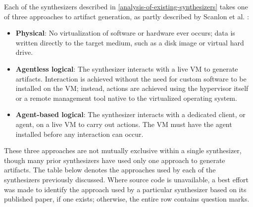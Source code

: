 Each of the synthesizers described in \autoref{analysis-of-existing-synthesizers} takes one of three
approaches to artifact generation, as partly described by Scanlon et al.
\cite{scanlonEviPlantEfficientDigital2017}:

\begin{itemize}
\tightlist
\item
  \textbf{Physical}: No virtualization of software or hardware ever
  occurs; data is written directly to the target medium, such as a disk
  image or virtual hard drive.
\item
  \textbf{Agentless logical}: The synthesizer interacts with a live VM
  to generate artifacts. Interaction is achieved without the need for
  custom software to be installed on the VM; instead, actions are
  achieved using the hypervisor itself or a remote management tool
  native to the virtualized operating system.
\item
  \textbf{Agent-based logical}: The synthesizer interacts with a
  dedicated client, or agent, on a live VM to carry out actions. The VM
  must have the agent installed before any interaction can occur.
\end{itemize}

These three approaches are not mutually exclusive within a single
synthesizer, though many prior synthesizers have used only one approach
to generate artifacts. The table below denotes the approaches used by
each of the synthesizers previously discussed. Where source code is
unavailable, a best effort was made to identify the approach used by a
particular synthesizer based on its published paper, if one exists;
otherwise, the entire row contains question marks.

